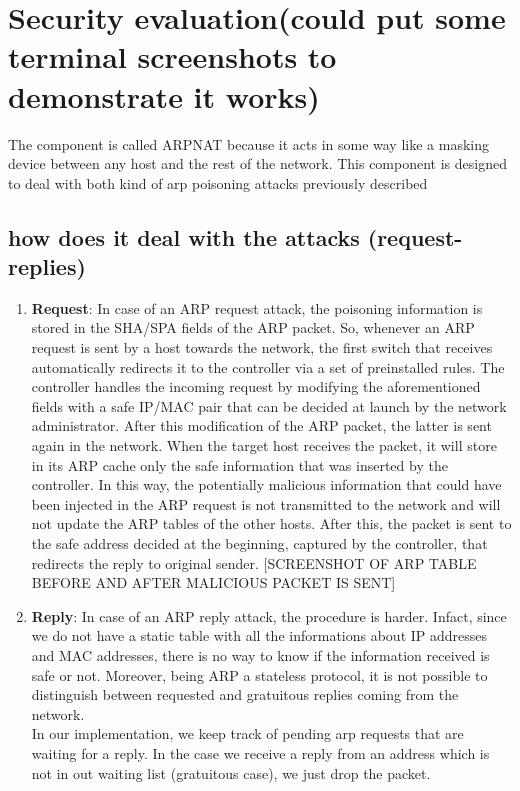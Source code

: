 \documentclass[11pt]{article}
\begin{document}
\section{Security evaluation(could put some terminal screenshots to demonstrate it works)}
The component is called ARPNAT because it acts in some way like a masking device between any host and the rest of the network. This component is designed to deal with both kind of arp poisoning attacks previously described

\subsection{how does it deal with the attacks (request-replies)}
\begin{enumerate}
  \item \textbf{Request}: In case of an ARP request attack, the poisoning information is stored in the SHA/SPA fields of the ARP packet. So, whenever an ARP request is sent by a host towards the network, the first switch that receives automatically redirects it to the controller via a set of preinstalled rules. The controller handles the incoming request by modifying the aforementioned fields with a safe IP/MAC pair that can be decided at launch by the network administrator. After this modification of the ARP packet, the latter is sent again in the network.
  When the target host receives the packet, it will store in its ARP cache only the safe information that was inserted by the controller. In this way, the potentially malicious information that could have been injected in the ARP request is not transmitted to the network and will not update the ARP tables of the other hosts.
  After this, the packet is sent to the safe address decided at the beginning, captured by the controller, that redirects the reply to original sender.
  [SCREENSHOT OF ARP TABLE BEFORE AND AFTER MALICIOUS PACKET IS SENT]
  \item \textbf{Reply}: In case of an ARP reply attack, the procedure is harder. Infact, since we do not have a static table with all the informations about IP addresses and MAC addresses, there is no way to know if the information received is safe or not. Moreover, being ARP a stateless protocol, it is not possible to distinguish between requested and gratuitous replies coming from the network.\\ 
  In our implementation, we keep track of pending arp requests that are waiting for a reply. In the case we receive a reply from an address which is not in out waiting list (gratuitous case), we just drop the packet.

\end{enumerate}
\end{document}
